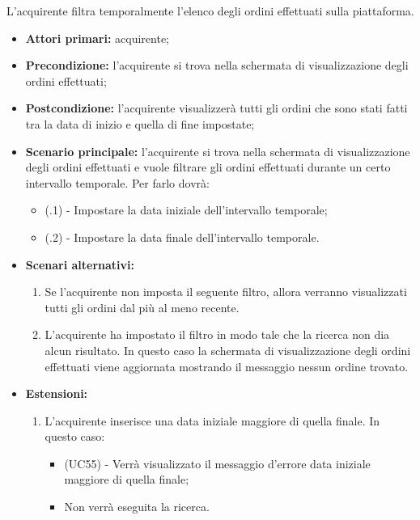 L'acquirente filtra temporalmente l'elenco degli ordini effettuati sulla piattaforma.
\begin{itemize}
    \item \textbf{Attori primari:} acquirente;
    \item \textbf{Precondizione:} l'acquirente si trova nella schermata di visualizzazione degli ordini effettuati;
    \item \textbf{Postcondizione:} l'acquirente visualizzerà tutti gli ordini che sono stati fatti tra la data di inizio e quella di fine impostate;
    \item \textbf{Scenario principale:} l'acquirente si trova nella schermata di visualizzazione degli ordini effettuati e vuole filtrare gli ordini effettuati durante un certo intervallo temporale. Per farlo dovrà:
    \begin{itemize}
        \item (\actualUC.1) - Impostare la data iniziale dell'intervallo temporale;
        \item (\actualUC.2) - Impostare la data finale dell'intervallo temporale.
    \end{itemize}
	\item \textbf{Scenari alternativi:}
	\begin{enumerate}[label=\lett]
		\item Se l'acquirente non imposta il seguente filtro, allora verranno visualizzati tutti gli ordini dal più al meno recente.
		\item L'acquirente ha impostato il filtro in modo tale che la ricerca non dia alcun risultato. In questo caso la schermata di visualizzazione degli ordini effettuati viene aggiornata mostrando il messaggio nessun ordine trovato.
	\end{enumerate}
    \item \textbf{Estensioni:}
    \begin{enumerate}[label=\lett]
        \item L'acquirente inserisce una data iniziale maggiore di quella finale. In questo caso:
        \begin{itemize}
            \item (UC55) - Verrà visualizzato il messaggio d'errore data iniziale maggiore di quella finale;
            \item Non verrà eseguita la ricerca.
        \end{itemize}
    \end{enumerate}
\end{itemize}

